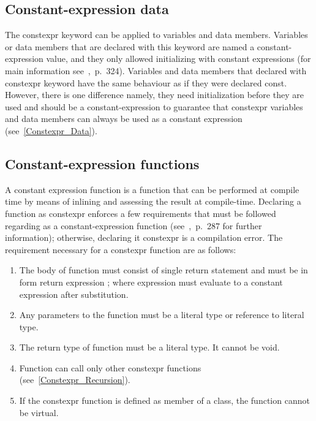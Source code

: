 \documentclass[11pt]{report}
\begin{document}
\subsection{Constant-expression data}
\label{subsection: constant-expression data}
The constexpr keyword can be applied to variables and data members. Variables or data members that are declared with this keyword are named a constant-expression value, and they only allowed initializing with constant expressions (for main information see~\cite{Williams:2012:CCA},~p.~324). Variables and data members that declared with constexpr keyword have the same behaviour as if they were declared const. However, there is one difference namely, they need initialization before they are used and should be a constant-expression to guarantee that constexpr variables and data members can always be used as a constant expression (see~\ref{Constexpr_Data}). 

\subsection{Constant-expression functions}
\label{Constant Expression Functions}
A constant expression function is a function that can be performed at compile time by means of inlining and assessing the result at compile-time. Declaring a function as constexpr enforces a few requirements that must be followed regarding as a constant-expression function (see~\cite{Gregorie:professionalcpp},~p.~287 for further information); otherwise, declaring it constexpr is a compilation error. The requirement necessary for a constexpr function are as follows:

\begin{enumerate}
\item The body of function must consist of single return statement and must be in form {return expression ;} where expression must evaluate to a constant expression after substitution.

\item Any parameters to the function must be a literal type or reference to literal type.

\item The return type of function must be a literal type. It cannot be void.

\item Function can call only other constexpr functions (see~\ref{Constexpr_Recursion}).

\item If the constexpr function is defined as member of a class, the function cannot be virtual.
\end{enumerate}
\end{document}
